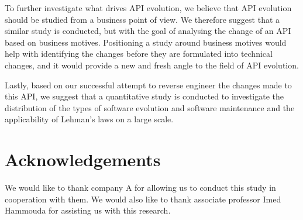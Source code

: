 \documentclass{sig-alternate}
\begin{document}
To further investigate what drives API evolution, we believe that API evolution should be studied from a business point of view. We therefore suggest that a similar study is conducted, but with the goal of analysing the change of an API based on business motives. Positioning a study around business motives would help with identifying the changes before they are formulated into technical changes, and it would provide a new and fresh angle to the field of API evolution. 

Lastly, based on our successful attempt to reverse engineer the changes made to this API, we suggest that a quantitative study is conducted to investigate the distribution of the types of software evolution and software maintenance and the applicability of Lehman's laws on a large scale. 










\section*{Acknowledgements}
We would like to thank company A for allowing us to conduct this study in cooperation with them. We would also like to thank associate professor Imed Hammouda for assisting us with this research. 




 
\end{document}
